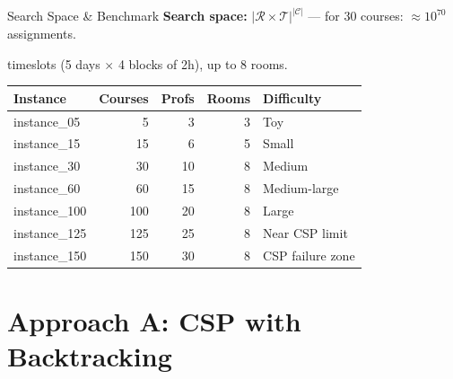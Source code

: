 \documentclass{beamer}
\begin{document}
\begin{frame}{Search Space \& Benchmark}
    \textbf{Search space:} $|\mathcal{R} \times \mathcal{T}|^{|\mathcal{C}|}$ — for 30 courses: $\approx 10^{70}$ assignments.

     timeslots (5 days $\times$ 4 blocks of 2h), up to 8 rooms.

    \bigskip
    \begin{table}
    \small
    \begin{tabular}{@{}lrrrl@{}}
    \toprule
    Instance & Courses & Profs & Rooms & Difficulty \\
    \midrule
    instance\_05  &   5 &  3 & 3 & Toy \\
    instance\_15  &  15 &  6 & 5 & Small \\
    instance\_30  &  30 & 10 & 8 & Medium \\
    instance\_60  &  60 & 15 & 8 & Medium-large \\
    instance\_100 & 100 & 20 & 8 & Large \\
    instance\_125 & 125 & 25 & 8 & Near CSP limit \\
    instance\_150 & 150 & 30 & 8 & CSP failure zone \\
    \bottomrule
    \end{tabular}
    \end{table}
\end{frame}

\section{Approach A: CSP with Backtracking}
\end{document}
